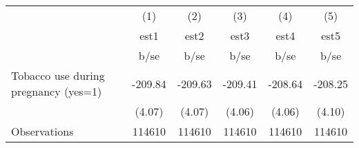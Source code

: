 {
\def\sym#1{\ifmmode^{#1}\else\(^{#1}\)\fi}
\begin{tabular}{l*{5}{c}}
\hline\hline
                                                  &\multicolumn{1}{c}{(1)}&\multicolumn{1}{c}{(2)}&\multicolumn{1}{c}{(3)}&\multicolumn{1}{c}{(4)}&\multicolumn{1}{c}{(5)}\\
                                                  &        est1&        est2&        est3&        est4&        est5\\
                                                  &        b/se&        b/se&        b/se&        b/se&        b/se\\
\hline
Tobacco use during pregnancy (yes=1)              &     -209.84&     -209.63&     -209.41&     -208.64&     -208.25\\
                                                  &      (4.07)&      (4.07)&      (4.06)&      (4.06)&      (4.10)\\
\hline
Observations                                      &      114610&      114610&      114610&      114610&      114610\\
\hline\hline
\end{tabular}
}

